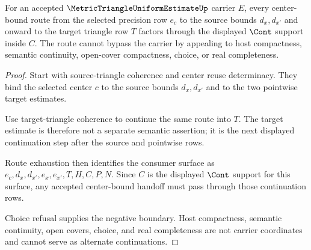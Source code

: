 \begin{theorem}
\label{thm:metric-triangle-uniform-estimate-center-bound-continuation}
For an accepted $\MetricTriangleUniformEstimateUp$ carrier $E$, every center-bound route from the selected precision row $e_c$ to the source bounds $d_x,d_{x'}$ and onward to the target triangle row $T$ factors through the displayed $\Cont$ support inside $C$. The route cannot bypass the carrier by appealing to host compactness, semantic continuity, open-cover compactness, choice, or real completeness.
\end{theorem}
\begin{proof}
Start with source-triangle coherence and center reuse determinacy. They bind the selected center $c$ to the source bounds $d_x,d_{x'}$ and to the two pointwise target estimates.

Use target-triangle coherence to continue the same route into $T$. The target estimate is therefore not a separate semantic assertion; it is the next displayed continuation step after the source and pointwise rows.

Route exhaustion then identifies the consumer surface as $e_c,d_x,d_{x'},e_x,e_{x'},T,H,C,P,N$. Since $C$ is the displayed $\Cont$ support for this surface, any accepted center-bound handoff must pass through those continuation rows.

Choice refusal supplies the negative boundary. Host compactness, semantic continuity, open covers, choice, and real completeness are not carrier coordinates and cannot serve as alternate continuations.
\end{proof}

